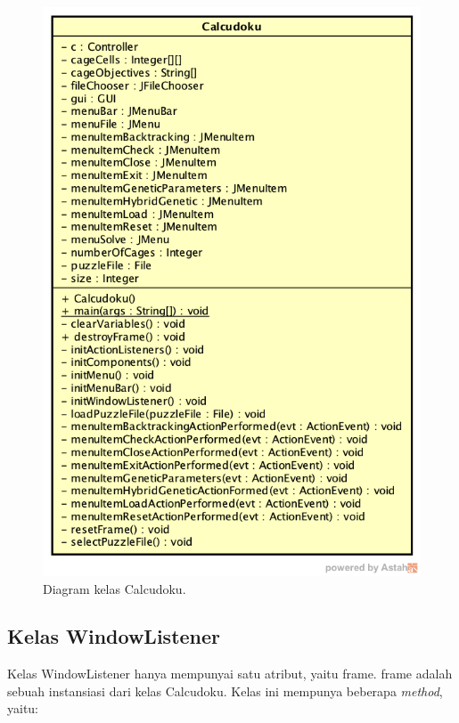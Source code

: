 \begin{figure}
\centering
\captionsetup{justification=centering}
\includegraphics[scale=0.5]{Gambar/Perancangan/DiagramKelasCalcudoku.png}
\caption[Diagram kelas Calcudoku.]{Diagram kelas Calcudoku.}
\label{fig:diagramkelascalcudoku}
\end{figure}

\subsection{Kelas WindowListener}
\label{sec:kelaswindowlistener}

Kelas WindowListener hanya mempunyai satu atribut, yaitu frame. frame adalah sebuah instansiasi dari kelas Calcudoku. Kelas ini mempunya beberapa \textit{method}, yaitu:

